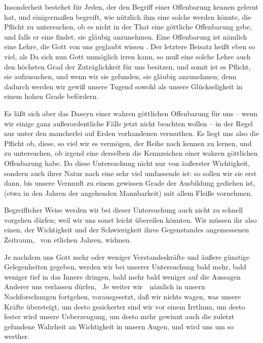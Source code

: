 \begin{aufza}\setcounter{enumi}{2}
\item Insonderheit bestehet für Jeden, der den Begriff einer Offenbarung kennen gelernt hat, und einigermaßen begreift, wie nützlich ihm eine solche werden könnte, die Pflicht zu untersuchen, ob es nicht in der That eine göttliche Offenbarung gebe, und falls er eine findet, sie gläubig anzunehmen. Eine Offenbarung ist nämlich eine Lehre, die Gott von uns geglaubt wissen . Der letztere Beisatz heißt eben so viel, als  Da sich nun Gott unmöglich irren kann, so muß eine solche Lehre auch  den höchsten Grad der Zuträglichkeit für uns besitzen, und somit ist es Pflicht, sie aufzusuchen, und wenn wir sie gefunden, sie gläubig anzunehmen; denn dadurch werden wir gewiß unsere Tugend sowohl als unsere Glückseligkeit in einem hohen Grade befördern.
\item Es läßt sich aber das Daseyn einer wahren göttlichen Offenbarung für uns -- wenn wir einige ganz außerordentliche Fälle jetzt nicht beachten wollen -- in der Regel nur unter den mancherlei auf Erden vorhandenen  vermuthen. Es liegt uns also die Pflicht ob, diese, so viel wir es vermögen, der Reihe nach kennen zu lernen, und zu untersuchen, ob irgend eine derselben die Kennzeichen einer wahren göttlichen Offenbarung habe. Da diese Untersuchung nicht nur von äußerster Wichtigkeit, sondern auch ihrer Natur nach eine sehr viel umfassende ist: so sollen wir sie erst dann, bis unsere Vernunft zu einem gewissen Grade der Ausbildung gediehen ist, (etwa in den Jahren der angehenden Mannbarkeit) mit allem Fleiße vornehmen.
\item Begreiflicher Weise werden wir bei dieser Untersuchung auch nicht zu schnell vorgehen dürfen; weil wir uns sonst leicht übereilen könnten. Wir müssen ihr also einen, der Wichtigkeit und der Schwierigkeit ihres Gegenstandes angemessenen Zeitraum, \zB\ von etlichen Jahren, widmen.
\item Je nachdem uns Gott mehr oder weniger Verstandeskräfte und äußere günstige Gelegenheiten gegeben, werden wir bei unserer Untersuchung bald mehr, bald weniger tief in das Innere dringen, bald mehr bald weniger auf die Aussagen Anderer uns verlassen dürfen, \usw\ Je weiter wir~\ nämlich in unsern Nachforschungen fortgehen, vorausgesetzt, daß wir nichts wagen, was unsere Kräfte übersteigt, um desto gesicherter sind wir vor einem Irrthum, um desto fester wird unsere Ueberzeugung, um desto mehr gewinnt auch die zuletzt gefundene Wahrheit an Wichtigkeit in unsern Augen, und wird uns um so werther.

\end{aufza}
